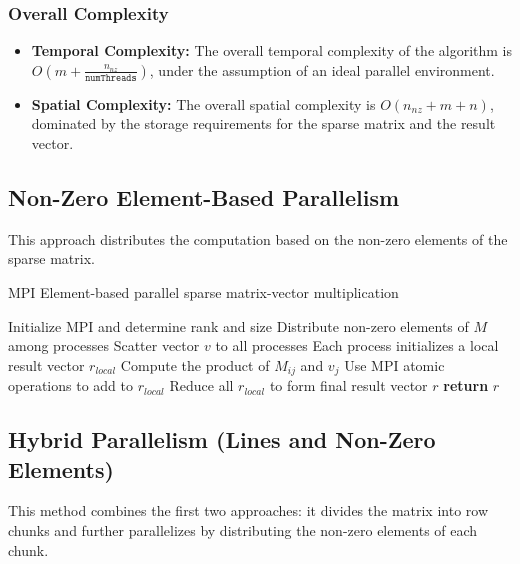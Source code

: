 \documentclass[12pt,oneside]{book} %
\begin{document}
\subsubsection{Overall Complexity}
\begin{itemize}
    \item \textbf{Temporal Complexity:} The overall temporal complexity of the algorithm is \(O(m + \frac{n_{nz}}{\texttt{numThreads}})\), under the assumption of an ideal parallel environment.

    \item \textbf{Spatial Complexity:} The overall spatial complexity is \(O(n_{nz} + m + n)\), dominated by the storage requirements for the sparse matrix and the result vector.
\end{itemize}

\subsection{Non-Zero Element-Based Parallelism}

This approach distributes the computation based on the non-zero elements of the
sparse matrix.

\begin{algorithm}[H]
    \caption{MPI Element-based parallel sparse matrix-vector multiplication}
    \begin{algorithmic}[1]
        \State Initialize MPI and determine rank and size
        \State Distribute non-zero elements of $M$ among processes
        \State Scatter vector $v$ to all processes
        \State Each process initializes a local result vector $r_{local}$
        \State Compute the product of $M_{ij}$ and $v_j$
        \State Use MPI atomic operations to add to $r_{local}$
        \EndFor
        \State Reduce all $r_{local}$ to form final result vector $r$
        \State \textbf{return} $r$
        \EndProcedure
    \end{algorithmic}
\end{algorithm}

\subsection{Hybrid Parallelism (Lines and Non-Zero Elements)}

This method combines the first two approaches: it divides the matrix into row
chunks and further parallelizes by distributing the non-zero elements of each
chunk.
\end{document}
